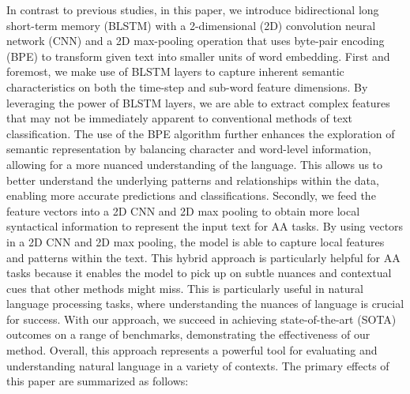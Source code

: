 \documentclass[conference]{IEEEtran}
\begin{document}
In contrast to previous studies, in this paper, we introduce bidirectional long short-term memory (BLSTM) with a 2-dimensional (2D) convolution neural network (CNN) and a 2D max-pooling operation that uses byte-pair encoding (BPE) to transform given text into smaller units of word embedding. First and foremost, we make use of BLSTM layers to capture inherent semantic characteristics on both the time-step and sub-word feature dimensions. By leveraging the power of BLSTM layers, we are able to extract complex features that may not be immediately apparent to conventional methods of text classification. The use of the BPE algorithm further enhances the exploration of semantic representation by balancing character and word-level information, allowing for a more nuanced understanding of the language. This allows us to better understand the underlying patterns and relationships within the data, enabling more accurate predictions and classifications. Secondly, we feed the feature vectors into a 2D CNN and 2D max pooling to obtain more local syntactical information to represent the input text for AA tasks. By using vectors in a 2D CNN and 2D max pooling, the model is able to capture local features and patterns within the text. This hybrid approach is particularly helpful for AA tasks because it enables the model to pick up on subtle nuances and contextual cues that other methods might miss. This is particularly useful in natural language processing tasks, where understanding the nuances of language is crucial for success. With our approach, we succeed in achieving state-of-the-art (SOTA) outcomes on a range of benchmarks, demonstrating the effectiveness of our method. Overall, this approach represents a powerful tool for evaluating and understanding natural language in a variety of contexts.  The primary effects of this paper are summarized as follows:
\end{document}
